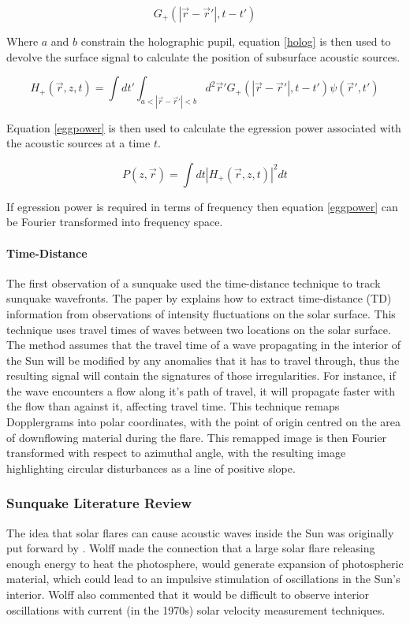 \begin{equation}\label{green}
G_{+}(|\vec{r}-\vec{r}'|,t-t')
\end{equation}

Where $a$ and $b$ constrain the holographic pupil, equation \ref{holog} is then used to devolve the surface signal to calculate the position of subsurface acoustic sources.

\begin{equation}\label{holog}
H_{+}(\vec{r},z,t)= \int dt'  \int_{a<|\vec{r}-\vec{r}'|<b} d^{2}\vec{r}'G_{+}(|\vec{r}-\vec{r}'|,t-t')\psi(\vec{r}',t')
\end{equation}

Equation \ref{eggpower} is then used to calculate the egression power associated with the acoustic sources at a time $t$.

\begin{equation}\label{eggpower}
P(z,\vec{r})=\int dt|H_{+}(\vec{r},z,t)|^{2}dt
\end{equation}

If egression power is required in terms of frequency then equation \ref{eggpower} can be Fourier transformed into frequency space.


\paragraph{Time-Distance}\label{TD}
The first observation of a sunquake \citep{1998Natur.393..317K} used the time-distance technique to track sunquake wavefronts. The paper by \cite{1993Natur.362..430D} explains how to extract time-distance (TD) information from observations of intensity fluctuations on the solar surface. This technique uses travel times of waves between two locations on the solar surface. The method assumes that the travel time of a wave propagating in the interior of the Sun will be modified by any anomalies that it has to travel through, thus the resulting signal will contain the signatures of those irregularities. For instance, if the wave encounters a flow along it's path of travel, it will propagate faster with the flow than against it, affecting travel time.
This technique remaps Dopplergrams into polar coordinates, with the point of origin centred on the area of downflowing material during the flare. This remapped image is then Fourier transformed with respect to azimuthal angle, with the resulting image highlighting circular disturbances as a line of positive slope.

\subsubsection{Sunquake Literature Review}
The idea that solar flares can cause acoustic waves inside the Sun was originally put forward by \citep{1972ApJ...176..833W}. Wolff made the connection that a large solar flare releasing enough energy to heat the photosphere, would generate expansion of photospheric material, which could lead to an impulsive stimulation of oscillations in the Sun's interior. Wolff also commented that it would be difficult to observe interior oscillations with current (in the 1970s) solar velocity measurement techniques.

